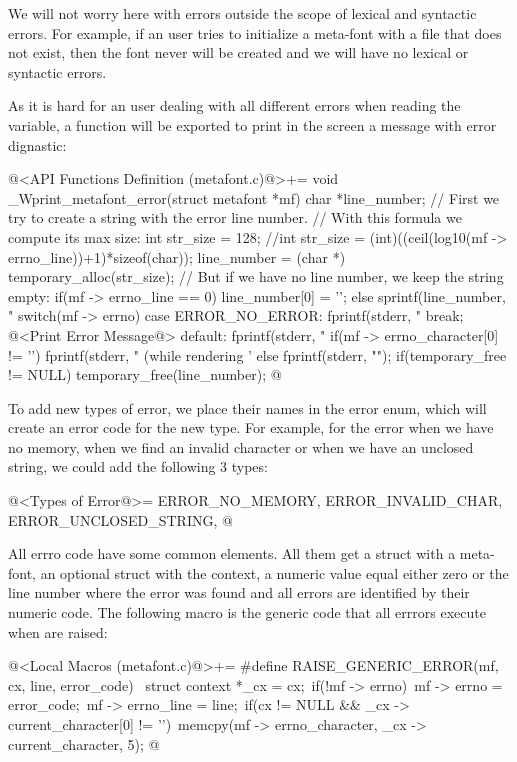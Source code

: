 We will not worry here with errors outside the scope of lexical and
syntactic errors. For example, if an user tries to initialize a
meta-font with a file that does not exist, then the font never will be
created and we will have no lexical or syntactic errors.

As it is hard for an user dealing with all different errors when
reading the  variable, a function will be exported
to print in the screen a message with error dignastic:

\iniciocodigo
@<API Functions Definition (metafont.c)@>+=
void _Wprint_metafont_error(struct metafont *mf){
  char *line_number;
  // First we try to create a string with the error line number.
  // With this formula we compute its max size:
  int str_size = 128;
  //int str_size = (int)((ceil(log10(mf -> errno_line))+1)*sizeof(char));
  line_number = (char *) temporary_alloc(str_size);
  // But if we have no line number, we keep the string empty:
  if(mf -> errno_line == 0)
    line_number[0] = '\0';
  else
    sprintf(line_number, "%
  switch(mf -> errno){
  case ERROR_NO_ERROR:
    fprintf(stderr, "%
    break;
  @<Print Error Message@>
  default:
    fprintf(stderr, "%
  }
  if(mf -> errno_character[0] != '\0')
    fprintf(stderr, " (while rendering '%
  else
    fprintf(stderr, "\n");
  if(temporary_free != NULL)
    temporary_free(line_number);
}
@
\fimcodigo

To add new types of error, we place their names in the error enum,
which will create an error code for the new type. For example, for the
error when we have no memory, when we find an invalid character or
when we have an unclosed string, we could add the following 3 types:

\iniciocodigo
@<Types of Error@>=
ERROR_NO_MEMORY, ERROR_INVALID_CHAR, ERROR_UNCLOSED_STRING,
@
\fimcodigo

All errro code have some common elements. All them get a struct with a
meta-font, an optional struct with the context, a numeric value equal
either zero or the line number where the error was found and all
errors are identified by their numeric code. The following macro is
the generic code that all errrors execute when are raised:

\iniciocodigo
@<Local Macros (metafont.c)@>+=
#define RAISE_GENERIC_ERROR(mf, cx, line, error_code) {\
  struct context *_cx = cx;\
  if(!mf -> errno){\
    mf -> errno = error_code;\
    mf -> errno_line = line;\
    if(cx != NULL && _cx -> current_character[0] != '\0')\
      memcpy(mf -> errno_character, _cx -> current_character, 5);}}
@
\fimcodigo

